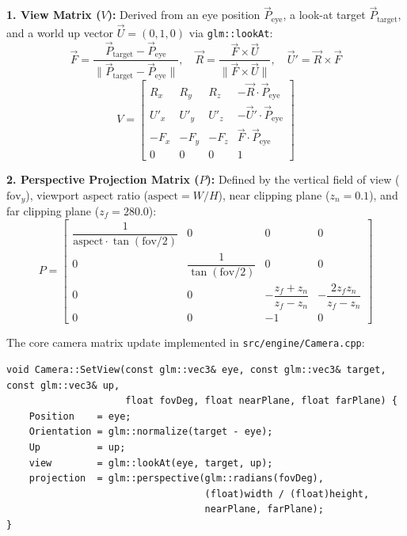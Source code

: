 \documentclass[11pt,a4paper]{article}
\begin{document}
\textbf{1. View Matrix ($V$):} Derived from an eye position $\vec{P}_{\text{eye}}$, a look-at target
$\vec{P}_{\text{target}}$, and a world up vector $\vec{U} = (0, 1, 0)$ via \texttt{glm::lookAt}:
\begin{equation}
\vec{F} = \frac{\vec{P}_{\text{target}} - \vec{P}_{\text{eye}}}{\|\vec{P}_{\text{target}} - \vec{P}_{\text{eye}}\|}, \quad
\vec{R} = \frac{\vec{F} \times \vec{U}}{\|\vec{F} \times \vec{U}\|}, \quad
\vec{U}' = \vec{R} \times \vec{F}
\end{equation}
\begin{equation}
V = \begin{bmatrix}
R_x & R_y & R_z & -\vec{R} \cdot \vec{P}_{\text{eye}} \\
U'_x & U'_y & U'_z & -\vec{U}' \cdot \vec{P}_{\text{eye}} \\
-F_x & -F_y & -F_z & \vec{F} \cdot \vec{P}_{\text{eye}} \\
0 & 0 & 0 & 1
\end{bmatrix}
\end{equation}

\textbf{2. Perspective Projection Matrix ($P$):} Defined by the vertical field of view ($\text{fov}_y$),
viewport aspect ratio ($\text{aspect} = W/H$), near clipping plane ($z_n = 0.1$), and far clipping
plane ($z_f = 280.0$):
\begin{equation}
P = \begin{bmatrix}
\dfrac{1}{\text{aspect} \cdot \tan(\text{fov}/2)} & 0 & 0 & 0 \\[6pt]
0 & \dfrac{1}{\tan(\text{fov}/2)} & 0 & 0 \\[6pt]
0 & 0 & -\dfrac{z_f + z_n}{z_f - z_n} & -\dfrac{2 z_f z_n}{z_f - z_n} \\[6pt]
0 & 0 & -1 & 0
\end{bmatrix}
\end{equation}

The core camera matrix update implemented in \texttt{src/engine/Camera.cpp}:
\begin{lstlisting}
void Camera::SetView(const glm::vec3& eye, const glm::vec3& target, const glm::vec3& up,
                     float fovDeg, float nearPlane, float farPlane) {
    Position    = eye;
    Orientation = glm::normalize(target - eye);
    Up          = up;
    view        = glm::lookAt(eye, target, up);
    projection  = glm::perspective(glm::radians(fovDeg),
                                   (float)width / (float)height,
                                   nearPlane, farPlane);
}
\end{lstlisting}
\end{document}
